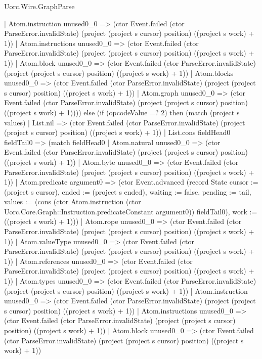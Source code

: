 \begin{lexlean}{Uorc.Wire.GraphParse}
\begin{semanticmodule}
{          | Atom.instruction unused0_0 => (ctor Event.failed (ctor ParseError.invalidState) (project (project s cursor) position) ((project s work) + 1))
          | Atom.instructions unused0_0 => (ctor Event.failed (ctor ParseError.invalidState) (project (project s cursor) position) ((project s work) + 1))
          | Atom.block unused0_0 => (ctor Event.failed (ctor ParseError.invalidState) (project (project s cursor) position) ((project s work) + 1))
          | Atom.blocks unused0_0 => (ctor Event.failed (ctor ParseError.invalidState) (project (project s cursor) position) ((project s work) + 1))
          | Atom.graph unused0_0 => (ctor Event.failed (ctor ParseError.invalidState) (project (project s cursor) position) ((project s work) + 1)))) else (if (opcodeValue =? 2) then (match (project s values)
        | List.nil => (ctor Event.failed (ctor ParseError.invalidState) (project (project s cursor) position) ((project s work) + 1))
        | List.cons fieldHead0 fieldTail0 => (match fieldHead0
          | Atom.natural unused0_0 => (ctor Event.failed (ctor ParseError.invalidState) (project (project s cursor) position) ((project s work) + 1))
          | Atom.byte unused0_0 => (ctor Event.failed (ctor ParseError.invalidState) (project (project s cursor) position) ((project s work) + 1))
          | Atom.predicate argument0 => (ctor Event.advanced (record State {cursor := (project s cursor), ended := (project s ended), waiting := false, pending := tail, values := (cons (ctor Atom.instruction (ctor Uorc.Core.Graph::Instruction.predicateConstant argument0)) fieldTail0), work := ((project s work) + 1)}))
          | Atom.rope unused0_0 => (ctor Event.failed (ctor ParseError.invalidState) (project (project s cursor) position) ((project s work) + 1))
          | Atom.valueType unused0_0 => (ctor Event.failed (ctor ParseError.invalidState) (project (project s cursor) position) ((project s work) + 1))
          | Atom.references unused0_0 => (ctor Event.failed (ctor ParseError.invalidState) (project (project s cursor) position) ((project s work) + 1))
          | Atom.types unused0_0 => (ctor Event.failed (ctor ParseError.invalidState) (project (project s cursor) position) ((project s work) + 1))
          | Atom.instruction unused0_0 => (ctor Event.failed (ctor ParseError.invalidState) (project (project s cursor) position) ((project s work) + 1))
          | Atom.instructions unused0_0 => (ctor Event.failed (ctor ParseError.invalidState) (project (project s cursor) position) ((project s work) + 1))
          | Atom.block unused0_0 => (ctor Event.failed (ctor ParseError.invalidState) (project (project s cursor) position) ((project s work) + 1))
}
\end{semanticmodule}
\end{lexlean}
